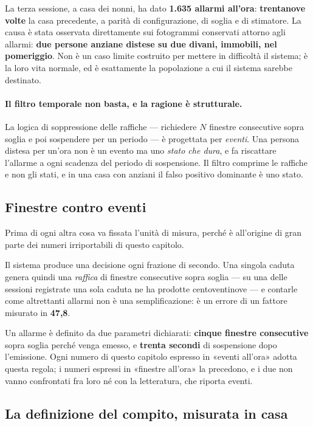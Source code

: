 La terza sessione, a casa dei nonni, ha dato \textbf{1.635 allarmi all'ora}: \textbf{trentanove volte} la casa precedente, a parità di configurazione, di soglia e di stimatore. La causa è stata osservata direttamente sui fotogrammi conservati attorno agli allarmi: \textbf{due persone anziane distese su due divani, immobili, nel pomeriggio}. Non è un caso limite costruito per mettere in difficoltà il sistema; è la loro vita normale, ed è esattamente la popolazione a cui il sistema sarebbe destinato.

\paragraph{Il filtro temporale non basta, e la ragione è strutturale.} La logica di soppressione delle raffiche --- richiedere $N$ finestre consecutive sopra soglia e poi sospendere per un periodo --- è progettata per \emph{eventi}. Una persona distesa per un'ora non è un evento ma uno \emph{stato che dura}, e fa riscattare l'allarme a ogni scadenza del periodo di sospensione. Il filtro comprime le raffiche e non gli stati, e in una casa con anziani il falso positivo dominante è uno stato.

\subsection{Finestre contro eventi}

Prima di ogni altra cosa va fissata l'unità di misura, perché è all'origine di
gran parte dei numeri irriportabili di questo capitolo.

Il sistema produce una decisione ogni frazione di secondo. Una singola caduta
genera quindi una \emph{raffica} di finestre consecutive sopra soglia --- su
una delle sessioni registrate una sola caduta ne ha prodotte centoventinove ---
e contarle come altrettanti allarmi non è una semplificazione: è un errore di
un fattore misurato in \textbf{47,8}.

Un allarme è definito da due parametri dichiarati: \textbf{cinque finestre
consecutive} sopra soglia perché venga emesso, e \textbf{trenta secondi} di
sospensione dopo l'emissione. Ogni numero di questo capitolo espresso in
«eventi all'ora» adotta questa regola; i numeri espressi in «finestre all'ora»
la precedono, e i due non vanno confrontati fra loro né con la letteratura,
che riporta eventi.

\subsection{La definizione del compito, misurata in casa}

